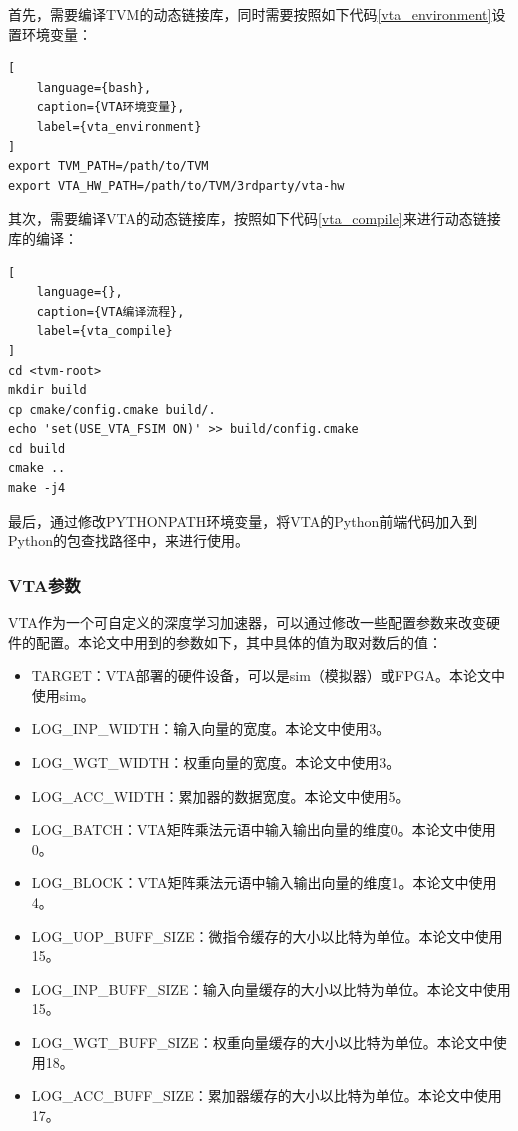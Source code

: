 首先，需要编译TVM的动态链接库，同时需要按照如下代码\ref{vta_environment}设置环境变量：

\begin{lstlisting}[
    language={bash},
    caption={VTA环境变量},
    label={vta_environment}
]
export TVM_PATH=/path/to/TVM
export VTA_HW_PATH=/path/to/TVM/3rdparty/vta-hw
\end{lstlisting}

其次，需要编译VTA的动态链接库，按照如下代码\ref{vta_compile}来进行动态链接库的编译：

\begin{lstlisting}[
    language={},
    caption={VTA编译流程},
    label={vta_compile}
]
cd <tvm-root>
mkdir build
cp cmake/config.cmake build/.
echo 'set(USE_VTA_FSIM ON)' >> build/config.cmake
cd build
cmake ..
make -j4
\end{lstlisting}

最后，通过修改PYTHONPATH环境变量，将VTA的Python前端代码加入到Python的包查找路径中，来进行使用。

\subsubsection{VTA参数}

VTA作为一个可自定义的深度学习加速器，可以通过修改一些配置参数来改变硬件的配置。本论文中用到的参数如下，其中具体的值为取对数后的值：
\begin{itemize}
    \item {TARGET：VTA部署的硬件设备，可以是sim（模拟器）或FPGA。本论文中使用sim。}
    \item {LOG\_INP\_WIDTH：输入向量的宽度。本论文中使用3。}
    \item {LOG\_WGT\_WIDTH：权重向量的宽度。本论文中使用3。}
    \item {LOG\_ACC\_WIDTH：累加器的数据宽度。本论文中使用5。}
    \item {LOG\_BATCH：VTA矩阵乘法元语中输入输出向量的维度0。本论文中使用0。}
    \item {LOG\_BLOCK：VTA矩阵乘法元语中输入输出向量的维度1。本论文中使用4。}
    \item {LOG\_UOP\_BUFF\_SIZE：微指令缓存的大小以比特为单位。本论文中使用15。}
    \item {LOG\_INP\_BUFF\_SIZE：输入向量缓存的大小以比特为单位。本论文中使用15。}
    \item {LOG\_WGT\_BUFF\_SIZE：权重向量缓存的大小以比特为单位。本论文中使用18。}
    \item {LOG\_ACC\_BUFF\_SIZE：累加器缓存的大小以比特为单位。本论文中使用17。}
\end{itemize}


